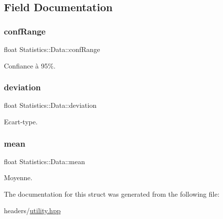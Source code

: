 \subsection{Field Documentation}
\mbox{\label{structStatistics_1_1Data_a098a51c15f9d1c2b0d50fd89fc956c06}} 
\subsubsection{\texorpdfstring{conf\+Range}{confRange}}
{\footnotesize\ttfamily float Statistics\+::\+Data\+::conf\+Range}



Confiance à 95\%. 

\mbox{\label{structStatistics_1_1Data_a4ab98072b8f7055a828ea80077a059f0}} 
\subsubsection{\texorpdfstring{deviation}{deviation}}
{\footnotesize\ttfamily float Statistics\+::\+Data\+::deviation}



Ecart-\/type. 

\mbox{\label{structStatistics_1_1Data_a70c674f35bce1803c894c1df2649ac3f}} 
\subsubsection{\texorpdfstring{mean}{mean}}
{\footnotesize\ttfamily float Statistics\+::\+Data\+::mean}



Moyenne. 



The documentation for this struct was generated from the following file\+:\begin{DoxyCompactItemize}
\item 
headers/\hyperlink{utility_8hpp}{utility.\+hpp}\end{DoxyCompactItemize}
